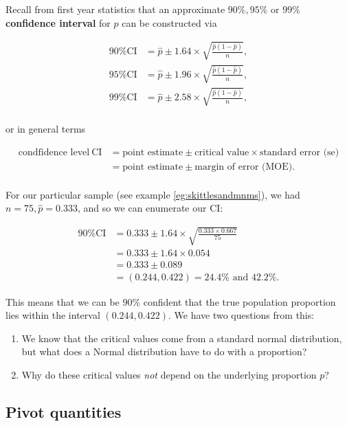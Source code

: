 Recall from first year statistics that an approximate \(90\%,95\%\) or \(99\%\) \textbf{confidence interval} for \(p\) can be constructed via 

\begin{align*}
    90\% \text{CI} &= \hat{p} \pm 1.64 \times \sqrt{\frac{\hat{p}(1-\hat{p})}{n}},\\
    95\% \text{CI} &= \hat{p} \pm 1.96 \times \sqrt{\frac{\hat{p}(1-\hat{p})}{n}},\\
    99\% \text{CI} &= \hat{p} \pm 2.58 \times \sqrt{\frac{\hat{p}(1-\hat{p})}{n}},\\
\end{align*}

or in general terms 

\begin{align*}
    \text{condfidence level}~ \text{CI} &= \text{point estimate} \pm \text{critical value} \times \text{standard error (se)}\\
    &= \text{point estimate} \pm \text{margin of error (MOE)}.\\
\end{align*}

For our particular sample (see example \ref{eg:skittlesandmnms}), we had \(n=75, \hat{p} = 0.333\), and so we can enumerate our CI:

\begin{align*}
    90\% \text{CI} &= 0.333 \pm 1.64 \times \sqrt{\frac{0.333 \times 0.667}{75}}\\
    &= 0.333 \pm 1.64 \times 0.054\\
    &= 0.333 \pm 0.089\\
    &= (0.244, 0.422) = 24.4\% \text{ and } 42.2\%.
\end{align*}

This means that we can be \(90\%\) confident that the true population proportion lies within the interval \((0.244, 0.422)\). 
We have two questions from this:

\begin{enumerate}
    \item We know that the critical values come from a standard normal distribution, but what does a Normal distribution have to do with a proportion?
    \item Why do these critical values \textit{not} depend on the underlying proportion \(p\)?
\end{enumerate}

\subsection{Pivot quantities}\label{subsec:pivot quants}


